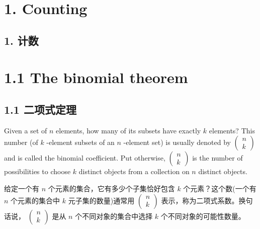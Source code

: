 \documentclass[10pt]{article}
\begin{document}
\section*{1. Counting}

\begin{tcolorbox}\relax
\section*{1. 计数}
\end{tcolorbox}

\section*{1.1 The binomial theorem}

\begin{tcolorbox}\relax
\section*{1.1 二项式定理}
\end{tcolorbox}

Given a set of \(n\) elements, how many of its subsets have exactly \(k\) elements? This number (of \(k\) -element subsets of an \(n\) -element set) is usually denoted by \(\left( \begin{array}{l} n \\  k \end{array}\right)\) and is called the binomial coefficient. Put otherwise, \(\left( \begin{array}{l} n \\  k \end{array}\right)\) is the number of possibilities to choose \(k\) distinct objects from a collection on \(n\) distinct objects.

\begin{tcolorbox}\relax
给定一个有 \(n\) 个元素的集合，它有多少个子集恰好包含 \(k\) 个元素？这个数(一个有 \(n\) 个元素的集合中 \(k\) 元子集的数量)通常用 \(\left( \begin{array}{l} n \\  k \end{array}\right)\) 表示，称为二项式系数。换句话说， \(\left( \begin{array}{l} n \\  k \end{array}\right)\) 是从 \(n\) 个不同对象的集合中选择 \(k\) 个不同对象的可能性数量。
\end{tcolorbox}
\end{document}
